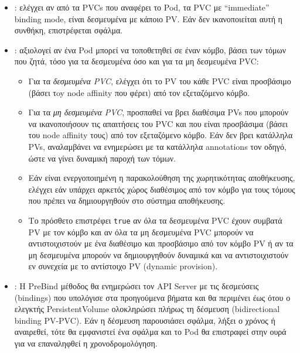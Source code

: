\begin{itemize}
      \tightlist
      \item {}: ελέγχει αν από τα PVCs που αναφέρει το Pod, τα PVC
            με “immediate”  binding mode, είναι δεσμευμένα με κάποιο PV. Εάν δεν
            ικανοποιείται αυτή η συνθήκη, επιστρέφεται σφάλμα.
      \item {}: αξιολογεί αν ένα Pod μπορεί να τοποθετηθεί σε έναν
            κόμβο, βάσει των τόμων που ζητά, τόσο για τα δεσμευμένα όσο και για
            τα μη δεσμευμένα PVC:
            \begin{itemize}
                  \tightlist
                  \item Για τα \textit{δεσμευμένα PVC}, ελέγχει ότι το PV του
                        κάθε PVC είναι προσβάσιμο (βάσει τoy node affinity που
                        φέρει) από τον εξεταζόμενο κόμβο.
                  \item Για τα \textit{μη δεσμευμένα PVC}, προσπαθεί να βρει
                        διαθέσιμα PVs που μπορούν να ικανοποιήσουν τις
                        απαιτήσεις του PVC και που είναι προσβάσιμα (βάσει του
                        node affinity τους) από τον εξεταζόμενο κόμβο. Εάν δεν
                        βρει κατάλληλα PVs, αναλαμβάνει να ενημερώσει με τα
                        κατάλληλα annotations τον οδηγό, ώστε να γίνει δυναμική
                        παροχή των τόμων.
                  \item Εάν είναι ενεργοποιημένη η παρακολούθηση της
                        χωρητικότητας αποθήκευσης, ελέγχει εάν υπάρχει αρκετός
                        χώρος διαθέσιμος από τον κόμβο για τους τόμους που
                        πρέπει να δημιουργηθούν στο σύστημα αποθήκευσης.
                  \item Το πρόσθετο επιστρέφει \texttt{true} αν όλα τα
                        δεσμευμένα PVC έχουν συμβατά PV με τον κόμβο και αν όλα
                        τα μη δεσμευμένα PVC μπορούν να αντιστοιχιστούν με ένα
                        διαθέσιμο και προσβάσιμο από τον κόμβο PV ή αν τα μη
                        δεσμευμένα μπορούν να δημιουργηθούν δυναμικά και να
                        αντιστοιχιστούν εν συνεχεία με το αντίστοιχο PV (dynamic
                        provision).
            \end{itemize}
      \item {}: Η PreBind μέθοδος θα ενημερώσει τον API Server με τις
            δεσμεύσεις (bindings) που υπολόγισε στα προηγούμενα βήματα και θα
            περιμένει έως ότου ο ελεγκτής PersistentVolume ολοκληρώσει πλήρως τη
            δέσμευση (bidirectional binding PV-PVC). Εάν η δέσμευση παρουσιάσει
            σφάλμα, λήξει ο χρόνος ή αναιρεθεί, τότε θα εμφανιστεί ένα σφάλμα
            και το Pod θα επιστραφεί στην ουρά για να επαναληφθεί η
            χρονοδρομολόγηση.
\end{itemize}


